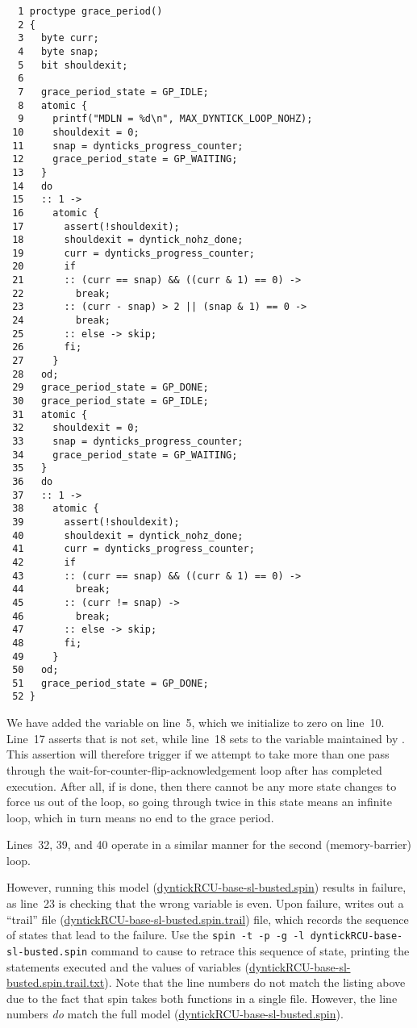 { \scriptsize
\begin{verbatim}
  1 proctype grace_period()
  2 {
  3   byte curr;
  4   byte snap;
  5   bit shouldexit;
  6
  7   grace_period_state = GP_IDLE;
  8   atomic {
  9     printf("MDLN = %d\n", MAX_DYNTICK_LOOP_NOHZ);
 10     shouldexit = 0;
 11     snap = dynticks_progress_counter;
 12     grace_period_state = GP_WAITING;
 13   }
 14   do
 15   :: 1 ->
 16     atomic {
 17       assert(!shouldexit);
 18       shouldexit = dyntick_nohz_done;
 19       curr = dynticks_progress_counter;
 20       if
 21       :: (curr == snap) && ((curr & 1) == 0) ->
 22         break;
 23       :: (curr - snap) > 2 || (snap & 1) == 0 ->
 24         break;
 25       :: else -> skip;
 26       fi;
 27     }
 28   od;
 29   grace_period_state = GP_DONE;
 30   grace_period_state = GP_IDLE;
 31   atomic {
 32     shouldexit = 0;
 33     snap = dynticks_progress_counter;
 34     grace_period_state = GP_WAITING;
 35   }
 36   do
 37   :: 1 ->
 38     atomic {
 39       assert(!shouldexit);
 40       shouldexit = dyntick_nohz_done;
 41       curr = dynticks_progress_counter;
 42       if
 43       :: (curr == snap) && ((curr & 1) == 0) ->
 44         break;
 45       :: (curr != snap) ->
 46         break;
 47       :: else -> skip;
 48       fi;
 49     }
 50   od;
 51   grace_period_state = GP_DONE;
 52 }
\end{verbatim}
}

We have added the  variable on line~5,
which we initialize to zero on line~10.
Line~17 asserts that  is not set, while
line~18 sets  to the 
variable maintained by .
This assertion will therefore trigger if we attempt to take more than
one pass through the wait-for-counter-flip-acknowledgement
loop after  has completed
execution.
After all, if  is done, then there cannot be
any more state changes to force us out of the loop, so going through twice
in this state means an infinite loop, which in turn means no end to the
grace period.

Lines~32, 39, and 40 operate in a similar manner for the
second (memory-barrier) loop.

However, running this
model (\url{dyntickRCU-base-sl-busted.spin})
results in failure, as line~23 is checking that the wrong variable
is even.
Upon failure,  writes out a
``trail'' file
(\url{dyntickRCU-base-sl-busted.spin.trail})
file, which records the sequence of states that lead to the failure.
Use the {\tt spin -t -p -g -l dyntickRCU-base-sl-busted.spin}
command to cause  to retrace this sequence of state,
printing the statements executed and the values of variables
(\url{dyntickRCU-base-sl-busted.spin.trail.txt}).
Note that the line numbers do not match the listing above due to
the fact that spin takes both functions in a single file.
However, the line numbers \emph{do} match the full
model (\url{dyntickRCU-base-sl-busted.spin}).

